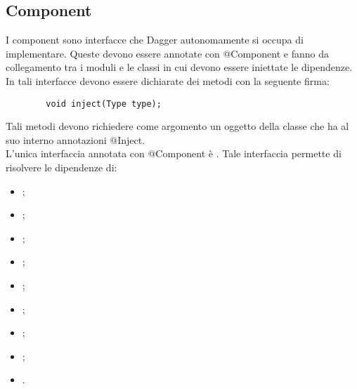 \documentclass[../ManualeSviluppatore.tex]{subfiles}
\begin{document}
	\subsection{Component}
	I component sono interfacce che Dagger autonomamente si occupa di implementare. Queste devono essere annotate con @Component e fanno da collegamento tra i moduli e le classi in cui devono essere iniettate le dipendenze. In tali interfacce devono essere dichiarate dei metodi con la seguente firma:
	\begin{lstlisting}
		void inject(Type type);
	\end{lstlisting}
	Tali metodi devono richiedere come argomento un oggetto della classe che ha al suo interno annotazioni @Inject. \\
	L'unica interfaccia annotata con @Component è \InfoComponent. Tale interfaccia permette di risolvere le dipendenze di:
	\begin{itemize}
		\item \HomeActivity;
		\item \DeveloperUnlockerActivity;
		\item \LogInformationActivity;
		\item \MainDeveloperActivity;
		\item \MainDeveloperPresenter;
		\item \MyApplication;
		\item \NavigationActivity;
		\item \NearbyPoiActivity;
		\item \PoiCategoryActivity.
	\end{itemize}
\end{document}
